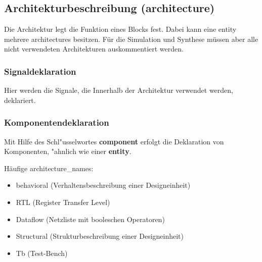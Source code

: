 \begin{multicols}{2}	
	\subsection{Architekturbeschreibung (architecture)}
	Die Architektur legt die Funktion eines Blocks fest. Dabei kann eine entity mehrere architectures besitzen. Für die Simulation und Synthese müssen aber alle nicht verwendeten Architekturen auskommentiert werden.
	
	\vfill\null
	\columnbreak
	\subsubsection{Signaldeklaration}
	 Hier werden die Signale, die Innerhalb der Architektur verwendet werden, deklariert.
	
	\subsubsection{Komponentendeklaration}
		Mit Hilfe des Schl"usselwortes \textbf{component} erfolgt die Deklaration von Komponenten, "ahnlich wie einer \textbf{entity}.\\
		
\end{multicols}%
\vspace{-2\baselineskip}
\begin{multicols}{2}
Häufige architecture\_names:
\begin{itemize}
	\setlength\itemsep{-0.5em}
	\item behavioral (Verhaltensbeschreibung einer Designeinheit)
	\item RTL (Register Transfer Level)
	\item Dataflow (Netzliste mit booleschen Operatoren)
	\item Structural (Strukturbeschreibung einer Designeinheit)
	\item Tb (Test-Bench)
\end{itemize}
\end{multicols}

